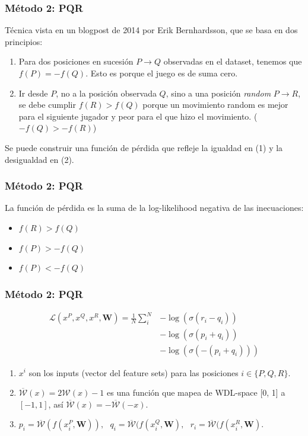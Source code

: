 \begin{frame}
\frametitle{Método 2: PQR}
Técnica vista en un blogpost de 2014 por Erik Bernhardsson, que se basa en dos principios: \pause \\
\begin{enumerate}
\item Para dos posiciones en sucesión $P \rightarrow Q$ observadas en el dataset, tenemos que \mbox{$f(P)=-f(Q)$}. Esto es porque el juego es de suma cero. \pause
\item Ir desde $P$, no a la posición observada $Q$, sino a una posición \textit{random} $P \rightarrow R$, se debe cumplir $f(R) > f(Q)$ porque un movimiento random es mejor para el siguiente jugador y peor para el que hizo el movimiento. ($-f(Q) > -f(R)$)
\end{enumerate}
\pause
Se puede construir una función de pérdida que refleje la igualdad en (1) y la desigualdad en (2).
\end{frame}


\begin{frame}
\frametitle{Método 2: PQR}
La función de pérdida es la suma de la log-likelihood negativa de las inecuaciones:
\begin{itemize}
\item ${f(R) > f(Q)}$
\item ${f(P) > - f(Q)}$
\item ${f(P) < -f(Q)}$
\end{itemize}
\end{frame}

\begin{frame}
\frametitle{Método 2: PQR}
\begin{align*}
\mathcal{L}(x^P, x^Q, x^R, \bm{W})=
\frac{1}{N}
\sum_i^N
& -\log\left(\sigma(r_i - q_i)\right) \\
& -\log\left(\sigma(p_i + q_i)\right) \\
& -\log\left(\sigma(-(p_i + q_i))\right)
\end{align*}
\begin{enumerate}
\itemsep0em
\item $x^i$ son los inputs (vector del feature sets) para las posiciones $i \in \{P,Q,R\}$.
\item $\overline{\mathcal{W}}(x) = 2 \mathcal{W}(x) - 1$ es una función que mapea de WDL-space [0, 1] a $[-1, 1]$, así $\overline{\mathcal{W}}(x) = -\overline{\mathcal{W}}(-x)$.
\item $
p_i = \overline{\mathcal{W}}(f(x^P_i, \bm{W})),\text{ }
q_i = \overline{\mathcal{W}}(f(x^Q_i, \bm{W}),\text{ }
r_i = \overline{\mathcal{W}}(f(x^R_i, \bm{W})
$.
\end{enumerate}
\end{frame}


